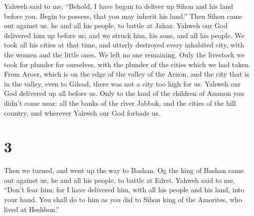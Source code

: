  Yahweh said to me, ``Behold, I have begun to deliver up
Sihon and his land before you. Begin to possess, that you may inherit
his land.''  Then Sihon came out against us, he and all
his people, to battle at Jahaz.  Yahweh our God delivered
him up before us; and we struck him, his sons, and all his people.
 We took all his cities at that time, and utterly
destroyed every inhabited city, with the women and the little ones. We
left no one remaining.  Only the livestock we took for
plunder for ourselves, with the plunder of the cities which we had
taken.  From Aroer, which is on the edge of the valley of
the Arnon, and the city that is in the valley, even to Gilead, there was
not a city too high for us. Yahweh our God delivered up all before us.
 Only to the land of the children of Ammon you didn't
come near: all the banks of the river Jabbok, and the cities of the hill
country, and wherever Yahweh our God forbade us.

\hypertarget{section-2}{%
\section{3}\label{section-2}}

 Then we turned, and went up the way to Bashan. Og the
king of Bashan came out against us, he and all his people, to battle at
Edrei.  Yahweh said to me, ``Don't fear him; for I have
delivered him, with all his people and his land, into your hand. You
shall do to him as you did to Sihon king of the Amorites, who lived at
Heshbon.''

